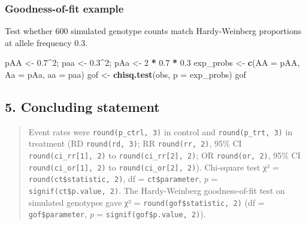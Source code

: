 \documentclass[
]{article}
\newenvironment{Shaded}{\begin{snugshade}}{\end{snugshade}}
\newcommand{\AttributeTok}[1]{\textcolor[rgb]{0.13,0.29,0.53}{#1}}
\newcommand{\DecValTok}[1]{\textcolor[rgb]{0.00,0.00,0.81}{#1}}
\newcommand{\FloatTok}[1]{\textcolor[rgb]{0.00,0.00,0.81}{#1}}
\newcommand{\FunctionTok}[1]{\textcolor[rgb]{0.13,0.29,0.53}{\textbf{#1}}}
\newcommand{\NormalTok}[1]{#1}
\newcommand{\OtherTok}[1]{\textcolor[rgb]{0.56,0.35,0.01}{#1}}
\newcommand{\SpecialCharTok}[1]{\textcolor[rgb]{0.81,0.36,0.00}{\textbf{#1}}}
\newcommand{\StringTok}[1]{\textcolor[rgb]{0.31,0.60,0.02}{#1}}
\begin{document}
\begin{Shaded}
\end{Shaded}

\subsubsection{Goodness-of-fit example}\label{goodness-of-fit-example}

Test whether 600 simulated genotype counts match Hardy-Weinberg
proportions at allele frequency 0.3.

\begin{Shaded}
\begin{Highlighting}[]
\NormalTok{pAA }\OtherTok{\textless{}{-}} \FloatTok{0.7}\SpecialCharTok{\^{}}\DecValTok{2}\NormalTok{; paa }\OtherTok{\textless{}{-}} \FloatTok{0.3}\SpecialCharTok{\^{}}\DecValTok{2}\NormalTok{; pAa }\OtherTok{\textless{}{-}} \DecValTok{2} \SpecialCharTok{*} \FloatTok{0.7} \SpecialCharTok{*} \FloatTok{0.3}
\NormalTok{exp\_probs }\OtherTok{\textless{}{-}} \FunctionTok{c}\NormalTok{(}\AttributeTok{AA =}\NormalTok{ pAA, }\AttributeTok{Aa =}\NormalTok{ pAa, }\AttributeTok{aa =}\NormalTok{ paa)}
\NormalTok{gof }\OtherTok{\textless{}{-}} \FunctionTok{chisq.test}\NormalTok{(obs, }\AttributeTok{p =}\NormalTok{ exp\_probs)}
\NormalTok{gof}
\end{Highlighting}
\end{Shaded}

\subsection{5. Concluding statement}\label{concluding-statement}

\begin{quote}
Event rates were \texttt{round(p\_ctrl,\ 3)} in control and
\texttt{round(p\_trt,\ 3)} in treatment (RD \texttt{round(rd,\ 3)}; RR
\texttt{round(rr,\ 2)}, 95\% CI \texttt{round(ci\_rr{[}1{]},\ 2)} to
\texttt{round(ci\_rr{[}2{]},\ 2)}; OR \texttt{round(or,\ 2)}, 95\% CI
\texttt{round(ci\_or{[}1{]},\ 2)} to \texttt{round(ci\_or{[}2{]},\ 2)}).
Chi-square test χ² = \texttt{round(ct\$statistic,\ 2)}, df =
\texttt{ct\$parameter}, \emph{p} = \texttt{signif(ct\$p.value,\ 2)}. The
Hardy-Weinberg goodness-of-fit test on simulated genotypes gave χ² =
\texttt{round(gof\$statistic,\ 2)} (df = \texttt{gof\$parameter},
\emph{p} = \texttt{signif(gof\$p.value,\ 2)}).
\end{quote}
\end{document}

